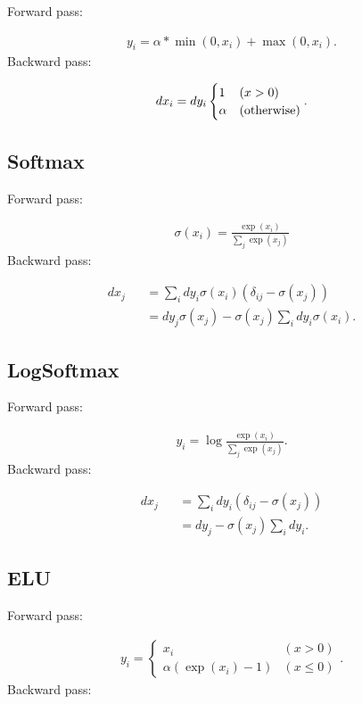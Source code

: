 \documentclass{article}
\begin{document}
Forward pass:

\begin{eqnarray}
  y_i = \alpha * \min(0, x_i) + \max (0, x_i).
\end{eqnarray}
%
Backward pass:

\begin{eqnarray}
  dx_i = dy_i \begin{cases}
     1      & (x > 0) \\
     \alpha & ({\rm otherwise})
  \end{cases}. 
\end{eqnarray}


\subsection{Softmax}

Forward pass:

\begin{eqnarray}
  \sigma(x_i) = \frac{\exp(x_i)}{\sum_j \exp(x_j)}
\end{eqnarray}
%
Backward pass:

\begin{eqnarray}
  dx_j &&= \sum_i dy_i \sigma(x_i) (\delta_{ij} - \sigma(x_j)) \\
       &&= dy_j \sigma(x_j) - \sigma(x_j) \sum_i dy_i \sigma(x_i).
\end{eqnarray}


\subsection{LogSoftmax}

Forward pass:

\begin{eqnarray}
  y_i = \log \frac{\exp(x_i)}{\sum_j \exp(x_j)}.
\end{eqnarray}
%
Backward pass:

\begin{eqnarray}
  dx_j &&= \sum_i dy_i (\delta_{ij} - \sigma(x_j)) \\
       &&= dy_j  - \sigma(x_j) \sum_i dy_i.
\end{eqnarray}


\subsection{ELU}

Forward pass:

\begin{eqnarray}
  y_i= \left\{
  \begin{array}{ll}
    x_i & (x > 0)\\
    \alpha (\exp(x_i) - 1) & (x \leq 0)
  \end{array} \right..
\end{eqnarray}
%
Backward pass:
\end{document}

